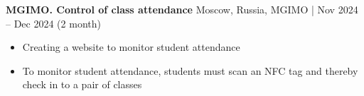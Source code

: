 \textbf{MGIMO. Control of class attendance} \hfill Moscow, Russia, MGIMO | Nov 2024 – Dec 2024 (2 month)
\begin{itemize}[noitemsep, topsep=0pt, partopsep=0pt, parsep=0pt]
    \item Creating a website to monitor student attendance
    \item To monitor student attendance, students must scan an NFC tag and thereby check in to a pair of classes
\end{itemize}